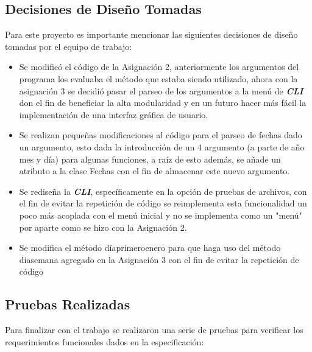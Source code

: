 \documentclass[10pt,journal,compsoc]{IEEEtran}
\begin{document}
\subsection{Decisiones de Diseño Tomadas}
	\par Para este proyecto es importante mencionar las siguientes decisiones de diseño tomadas por el equipo de trabajo:
	\begin{itemize}
		\item Se modificó el código de la Asignación 2, anteriormente los argumentos del programa los evaluaba el método que estaba siendo utilizado, ahora con la asignación 3 se decidió pasar el parseo de los argumentos a la menú de \textit{\textbf{CLI}} don el fin de beneficiar la alta modularidad y en un futuro hacer más fácil la implementación de una interfaz gráfica de usuario.
		\item Se realizan pequeñas modificaciones al código para el parseo de fechas dado un argumento, esto dada la introducción de un 4 argumento (a parte de año mes y día) para algunas funciones, a raíz de esto además, se añade un atributo a la clase Fechas con el fin de almacenar este nuevo argumento.
		\item Se rediseña la \textbf{\textit{CLI}}, específicamente en la opción de pruebas de archivos, con el fin de evitar la repetición de código se reimplementa esta funcionalidad un poco más acoplada con el menú inicial y no se implementa como un "menú" por aparte como se hizo con la Asignación 2.
		\item Se modifica el método día\textunderscore primero\textunderscore enero para que haga uso del método dia\textunderscore semana agregado en la Asignación 3 con el fin de evitar la repetición de código
	\end{itemize}
\subsection{Pruebas Realizadas}
	\par Para finalizar con el trabajo se realizaron una serie de pruebas para verificar los requerimientos funcionales dados en la especificación:
	
\end{document}
